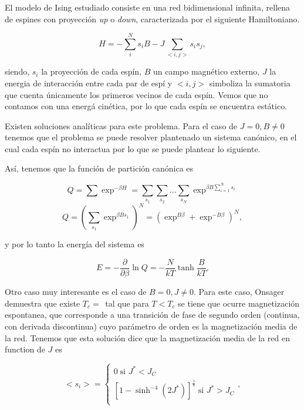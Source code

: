 \documentclass[
 reprint,
 amsmath,amssymb,
 aps,
]{revtex4-1}
\begin{document}
El modelo de Ising estudiado consiste en una red bidimensional infinita,
rellena de espines con proyecci\'on \textit{up} o \textit{down}, caracterizada
por el siguiente Hamiltoniano.

\begin{equation}
  H = - \sum_i^N s_i B - J \sum_{<i, j>} s_i s_j,
\end{equation}

siendo, $s_i$ la proyecci\'on de cada esp\'in, $B$ un campo magn\'etico externo,
$J$ la energia de interacci\'on entre cada par de esp\'i y $<i, j>$ simboliza la
sumatoria que cuenta \'unicamente los primeros vecinos de cada esp\'in. Vemos que
no contamos con una energ\'a cin\'etica, por lo que cada esp\'in se encuentra
est\'atico.

Existen soluciones anal\'iticas para este problema. Para el caso de $J = 0, B
\neq 0$ tenemos que el problema se puede resolver plantenado un sistema
can\'onico, en el cual cada esp\'in no interactua por lo que se puede plantear
lo siguiente.

As\'i, tenemos que la funci\'on de partici\'on can\'onica es

\begin{equation}
  Q = \sum \exp^{-\beta H} = \sum_{s_1} \sum_{s_2} ... \sum_{s_N} \exp^{\beta B \sum_{i = 1}^N s_i}
\end{equation}
\begin{equation}
  Q = (\sum_{s_1} \exp^{\beta B  s_1}) ^ N = (\exp^{B\beta} + \exp^{-B\beta}) ^ N,
\end{equation}

y por lo tanto la energ\'ia del sistema es

\begin{equation}
  E = -\frac{\partial}{\partial \beta} \ln Q = -\frac{N}{kT}\tanh{\frac{B}{kT}}.
\end{equation}

Otro caso muy interesante es el caso de $B = 0, J \neq 0$. Para este caso,
Onsager\cite{Onsager} demuestra que existe $T_c = \frac{}{}$ tal que para $T <
T_c$ se tiene que ocurre magnetizaci\'on espontanea, que corresponde a una
transici\'on de fase de segundo orden (continua, con derivada discontinua) cuyo
par\'ametro de orden es la magnetizaci\'on media de la red. Tenemos que esta
soluci\'on dice que la magnetizaci\'on media de la red en function de $J$ es

\begin{equation}
  <s_i> =
  \left \{
    \begin{matrix}
      0 \; \text{si } J^* < J_C \\
      [1 - \sinh^{-4} (2J^*)]^{\frac{1}{8}} \; \text{si } J^* > J_C \\
    \end{matrix}
  \right . ,
\end{equation}
\end{document}
